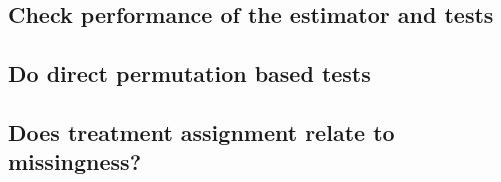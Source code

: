 \documentclass[11pt,]{article}
\begin{document}
\hypertarget{check-performance-of-the-estimator-and-tests}{%
\subsection{Check performance of the estimator and
tests}\label{check-performance-of-the-estimator-and-tests}}

\hypertarget{do-direct-permutation-based-tests}{%
\subsection{Do direct permutation based
tests}\label{do-direct-permutation-based-tests}}

\hypertarget{does-treatment-assignment-relate-to-missingness}{%
\subsection{Does treatment assignment relate to
missingness?}\label{does-treatment-assignment-relate-to-missingness}}

\printbibliography
\end{document}
